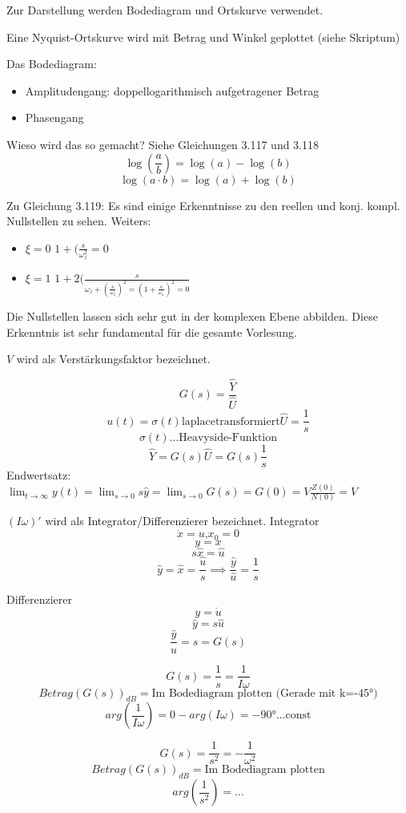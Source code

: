 \documentclass[a4paper]{article}
\begin{document}
Zur Darstellung werden Bodediagram und Ortskurve verwendet.

Eine Nyquist-Ortskurve wird mit Betrag und Winkel geplottet (siehe Skriptum)

Das Bodediagram:
\begin{itemize}
    \item Amplitudengang: doppellogarithmisch aufgetragener Betrag
    \item Phasengang
\end{itemize}

Wieso wird das so gemacht? Siehe Gleichungen 3.117 und 3.118
\[ \log(\frac{a}{b})=\log(a)-\log(b) \]
\[ \log(a\cdot b)=\log(a)+\log(b) \]

Zu Gleichung 3.119:
Es sind einige Erkenntnisse zu den reellen und konj. kompl. Nullstellen zu sehen.
Weiters:
\begin{itemize}
    \item $\xi=0$ \implies  $1+(\frac{s}{\omega_{z}^{2}}=0$ 
    \item $\xi=1$ \implies  $ 1+ 2(\frac{s}{\omega_{z}+(\frac{s}{\omega_{z}})^2=(1+\frac{s}{\omega_{z}})^{2}=0}$
\end{itemize}
Die Nullstellen lassen sich sehr gut in der komplexen Ebene abbilden.
Diese Erkenntnis ist sehr fundamental für die gesamte Vorlesung.

$V$ wird als Verstärkungsfaktor bezeichnet.

\[ G(s)=\frac{\hat{Y}}{\hat{U}} \]
\[ u(t)=\sigma(t) \text{laplacetransformiert} \hat{U}=\frac{1}{s}\]
\[ \sigma(t) \text{\ldots Heavyside-Funktion} \]
\[ \hat{Y}=G(s)\hat{U}=G(s) \frac{1}{s} \]
Endwertsatz: $\lim_{t \to \infty} y(t)=\lim_{s \to 0} s \hat{y}=\lim_{s \to 0} G(s)=G(0)=V \frac{Z(0)}{N(0)}=V$ 

$(I\omega)'$ wird als Integrator/Differenzierer bezeichnet.
Integrator
\[ \dot x=u \text{,} x_{0}=0\]
\[ y=x \]
\[ s \hat{x}=\hat{u} \]
\[ \hat{y}=\hat{x} = \frac{\hat{u}}{s} \implies \frac{\hat{y}}{\hat{u}}=\frac{1}{s}\]

Differenzierer
\[ y=\dot u \]
\[ \hat{y}=s \hat{u} \]
\[ \frac{\hat{y}}{u}=s=G(s) \]

\[ G(s)=\frac{1}{s}=\frac{1}{I\omega}\]
\[ Betrag(G(s))_{dB}= \text{Im Bodediagram plotten (Gerade mit k=-45°)}\]
\[ arg(\frac{1}{I\omega})=0-arg(I\omega)=-90° \text{\ldots const}\]


\[ G(s)=\frac{1}{s^{2}}=-\frac{1}{\omega^{2}}\]
\[ Betrag(G(s))_{dB}= \text{Im Bodediagram plotten}\]
\[ arg(\frac{1}{s^{2}})=\ldots \]
\end{document}
